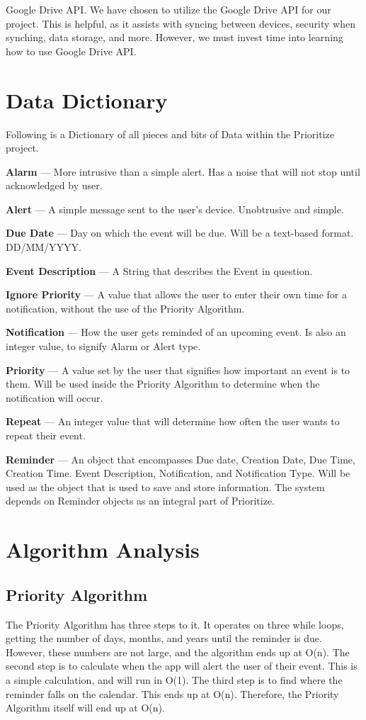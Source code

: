 \documentclass[12pt]{article}
\begin{document}
Google Drive API. We have chosen to utilize the Google Drive API for our project. This is helpful, as it assists with syncing between devices, security when synching, data storage, and more. However, we must invest time into learning how to use Google Drive API. 


\section{Data Dictionary}\label{Data Dictionary}
Following is a Dictionary of all pieces and bits of Data within the Prioritize project.

\textbf{Alarm} --- More intrusive than a simple alert. Has a noise that will not stop until acknowledged by user.

\textbf{Alert} --- A simple message sent to the user's device. Unobtrusive and simple.

\textbf{Due Date} --- Day on which the event will be due. Will be a text-based format. DD/MM/YYYY.

\textbf{Event Description} --- A String that describes the Event in question.

\textbf{Ignore Priority} --- A value that allows the user to enter their own time for a notification, without the use of the Priority Algorithm.

\textbf{Notification} --- How the user gets reminded of an upcoming event. Is also an integer value, to signify Alarm or Alert type.

\textbf{Priority} --- A value set by the user that signifies how important an event is to them. Will be used inside the Priority Algorithm to determine when the notification will occur.

\textbf{Repeat} --- An integer value that will determine how often the user wants to repeat their event.

\textbf{Reminder} --- An object that encompasses Due date, Creation Date, Due Time, Creation Time. Event Description, Notification, and Notification Type. Will be used as the object that is used to save and store information. The system depends on Reminder objects as an integral part of Prioritize.



\section{Algorithm Analysis}
\subsection{Priority Algorithm}
The Priority Algorithm has three steps to it. It operates on three while loops, getting the number of days, months, and years until the reminder is due. However, these numbers are not large, and the algorithm ends up at O(n). The second step is to calculate when the app will alert the user of their event. This is a simple calculation, and will run in O(1). The third step is to find where the reminder falls on the calendar. This ends up at O(n). Therefore, the Priority Algorithm itself will end up at O(n).
\end{document}
